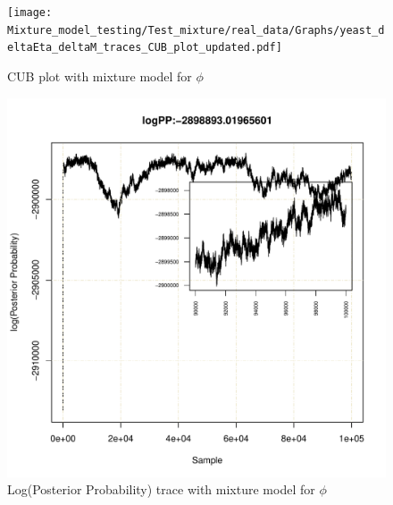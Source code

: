 \documentclass[11pt]{labbook}
\begin{document}
\begin{figure}[H]
\centering
\texttt{[image: Mixture\_model\_testing/Test\_mixture/real\_data/Graphs/yeast\_deltaEta\_deltaM\_traces\_CUB\_plot\_updated.pdf]}
\caption{CUB plot with mixture model for $\phi$}
\end{figure}

\begin{figure}[H]
\centering
\includegraphics[page=1,scale=0.6]{Mixture_model_testing/Test_mixture/real_data/Graphs/yeast_logPost_mixProb_phi_traces_updated.pdf}
\caption{Log(Posterior Probability) trace with mixture model for $\phi$}
\end{figure}
\end{document}
